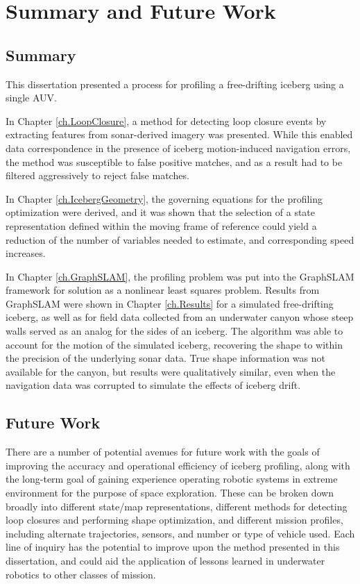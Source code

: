 
\chapter{Summary and Future Work}
\label{ch.FutureWork}

\section{Summary}

This dissertation presented a process for profiling a free-drifting iceberg using a single AUV. 

In Chapter \ref{ch.LoopClosure}, a method for detecting loop closure events by extracting features from sonar-derived imagery was presented. While this enabled data correspondence in the presence of iceberg motion-induced navigation errors, the method was susceptible to false positive matches, and as a result had to be filtered aggressively to reject false matches. 

In Chapter \ref{ch.IcebergGeometry}, the governing equations for the profiling optimization were derived, and it was shown that the selection of a state representation defined within the moving frame of reference could yield a reduction of the number of variables needed to estimate, and corresponding speed increases. 

In Chapter \ref{ch.GraphSLAM}, the profiling problem was put into the GraphSLAM framework for solution as a nonlinear least squares problem. Results from GraphSLAM were shown in Chapter \ref{ch.Results} for a simulated free-drifting iceberg, as well as for field data collected from an underwater canyon whose steep walls served as an analog for the sides of an iceberg. The algorithm was able to account for the motion of the simulated iceberg, recovering the shape to within the precision of the underlying sonar data. True shape information was not available for the canyon, but results were qualitatively similar, even when the navigation data was corrupted to simulate the effects of iceberg drift.

\section{Future Work}

There are a number of potential avenues for future work with the goals of improving the accuracy and operational efficiency of iceberg profiling, along with the long-term goal of gaining experience operating robotic systems in extreme environment for the purpose of space exploration. These can be broken down broadly into different state/map representations, different methods for detecting loop closures and performing shape optimization, and different mission profiles, including alternate trajectories, sensors, and number or type of vehicle used. Each line of inquiry has the potential to improve upon the method presented in this dissertation, and could aid the application of lessons learned in underwater robotics to other classes of mission.

